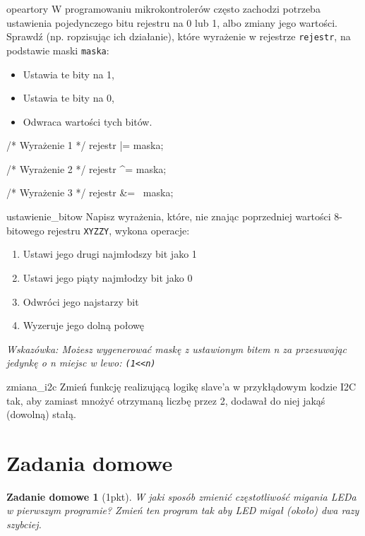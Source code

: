 \documentclass{pdfBooklets}
\begin{document}
\begin{Zadanie}{}{opeartory}
  W programowaniu mikrokontrolerów często zachodzi potrzeba ustawienia pojedynczego bitu rejestru na 0 lub 1, albo zmiany jego wartości.
  Sprawdź (np. ropzisując ich działanie), które wyrażenie w rejestrze \Verb$rejestr$, na podstawie maski \Verb$maska$:
  \begin{itemize}
  \item Ustawia te bity na 1,
  \item Ustawia te bity na 0,
  \item Odwraca wartości tych bitów.
  \end{itemize}

  \begin{CodeFrame*}[c]{}
    /* Wyrażenie 1 */
    rejestr |= maska;

    /* Wyrażenie 2 */
    rejestr ^= maska;

    /* Wyrażenie 3 */
    rejestr &= ~maska;
    \end{CodeFrame*}
\end{Zadanie}

\begin{Zadanie}{}{ustawienie_bitow}
  Napisz wyrażenia, które, nie znając poprzedniej wartości 8-bitowego rejestru \Verb$XYZZY$, wykona operacje:
  \begin{enumerate}
  \item Ustawi jego drugi najmłodszy bit jako 1
  \item Ustawi jego piąty najmłodzy bit jako 0
  \item Odwróci jego najstarzy bit
  \item Wyzeruje jego dolną połowę
  \end{enumerate}
  \textit{Wskazówka: Możesz wygenerować maskę z ustawionym bitem n za przesuwając jedynkę o n miejsc w lewo: \Verb$(1<<n)$}
\end{Zadanie}
\begin{Zadanie}{}{zmiana_i2c}
  Zmień funkcję realizującą logikę slave'a w przykłądowym kodzie I2C tak, aby zamiast mnożyć otrzymaną liczbę przez 2, dodawał do niej jakąś
  (dowolną) stałą.
\end{Zadanie}

\clearpage
\section{Zadania domowe}
\newtheorem{ZadanieDomowe}{Zadanie domowe}

\begin{ZadanieDomowe} [1pkt]
W jaki sposób zmienić częstotliwość migania LEDa w pierwszym programie? Zmień ten program tak aby LED migał (około) dwa razy szybciej.
\end{ZadanieDomowe}
\end{document}
